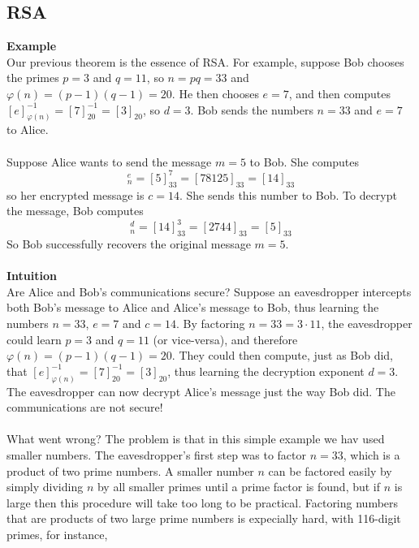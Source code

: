 \documentclass{report}
\theoremstyle{definition}
\begin{document}
\subsection{RSA}
\textbf{Example}\\
Our previous theorem is the essence of RSA. For example, suppose Bob chooses the primes $p=3$ and $q=11$, so $n=pq=33$ and
$\varphi(n)=(p-1)(q-1)=20$. He then chooses $e=7$, and then computes $[e]^{-1}_{\varphi(n)}=[7]^{-1}_{20}=[3]_{20}$, so $d=3$. Bob
sends the numbers $n=33$ and $e=7$ to Alice.\\
\vspace{1mm}\\
Suppose Alice wants to send the message $m=5$ to Bob. She computes
\begin{equation*}
[m]^e_n=[5]^7_{33}=[78125]_{33}=[14]_{33}
\end{equation*}
so her encrypted message is $c=14$. She sends this number to Bob. To decrypt the message, Bob computes
\begin{equation*}
[c]^d_n=[14]^3_{33}=[2744]_{33}=[5]_{33}
\end{equation*}
So Bob successfully recovers the original message $m=5$.\\
\vspace{1mm}\\
\textbf{Intuition}\\
Are Alice and Bob's communications secure? Suppose an eavesdropper intercepts both Bob's message to Alice and Alice's message to Bob,
thus learning the numbers $n=33$, $e=7$ and $c=14$. By factoring $n=33=3\cdot11$, the eavesdropper could learn $p=3$ and $q=11$ (or vice-versa), 
and therefore $\varphi(n)=(p-1)(q-1)=20$. They could then compute, just as Bob did, that $[e]^{-1}_{\varphi(n)}=[7]^{-1}_{20}=[3]_{20}$,
thus learning the decryption exponent $d=3$. The eavesdropper can now decrypt Alice's message just the way Bob did. The communications are not
secure!\\
\vspace{1mm}\\
What went wrong? The problem is that in this simple example we hav used smaller numbers. The eavesdropper's first step was to factor $n=33$, which
is a product of two prime numbers. A smaller number $n$ can be factored easily by simply dividing $n$ by all smaller primes until a prime factor 
is found, but if $n$ is large then this procedure will take too long to be practical.
Factoring numbers that are products of two large prime numbers is expecially hard, with 116-digit primes, for instance, 
\end{document}
